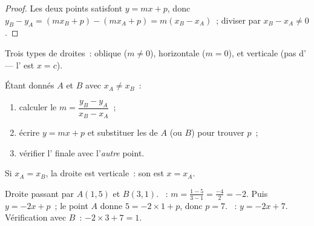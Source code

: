 \begin{proof}
Les deux points satisfont $y = mx + p$, donc
$y_B - y_A = (mx_B + p) - (mx_A + p) = m(x_B - x_A)$~; diviser par
$x_B - x_A \neq 0$.
\end{proof}

\begin{omfigure}

{\small Trois types de droites~: oblique ($m \neq 0$), horizontale
($m = 0$), et verticale (pas d' --- l' est
$x = c$).}
\end{omfigure}

\begin{method}\label{met:g10:lines:through}
Étant donnés $A$ et $B$ avec $x_A \neq x_B$~:
\begin{enumerate}
  \item calculer le 
        $m = \dfrac{y_B - y_A}{x_B - x_A}$~;
  \item écrire $y = mx + p$ et substituer les  de $A$ (ou $B$)
        pour trouver $p$~;
  \item vérifier l' finale avec l'\emph{autre} point.
\end{enumerate}
Si $x_A = x_B$, la droite est verticale~: son  est $x = x_A$.
\end{method}

\begin{example}\label{ex:g10:lines:through}
Droite passant par $A(1, 5)$ et $B(3, 1)$. ~:
$m = \frac{1 - 5}{3 - 1} = \frac{-4}{2} = -2$. Puis $y = -2x + p$~; le
point $A$ donne $5 = -2 \times 1 + p$, donc $p = 7$. ~:
$y = -2x + 7$. Vérification avec $B$~: $-2 \times 3 + 7 = 1$.
\end{example}


